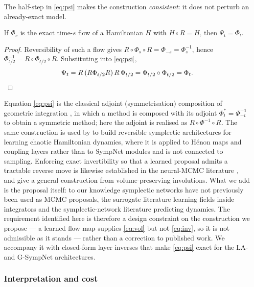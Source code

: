 The half-step in \eqref{eq:psi} makes the construction \emph{consistent}: it
does not perturb an already-exact model.

\begin{lemma}
\label{lem:consistency}
If $\Phi_s$ is the exact time-$s$ flow of a Hamiltonian $H$ with $H \circ R = H$,
then $\Psi_t = \Phi_t$.
\end{lemma}

\begin{proof}
Reversibility of such a flow gives $R \circ \Phi_s \circ R = \Phi_{-s} = \Phi_s^{-1}$,
hence $\Phi_{t/2}^{-1} = R \circ \Phi_{t/2} \circ R$. Substituting into
\eqref{eq:psi},
\begin{equation*}
    \Psi_t = R \,(R \Phi_{t/2} R)\, R\, \Phi_{t/2}
           = \Phi_{t/2} \circ \Phi_{t/2} = \Phi_t . \qedhere
\end{equation*}
\end{proof}

Equation \eqref{eq:psi} is the classical adjoint (symmetrisation) composition
of geometric integration \cite{HairerLubichWanner}, in which a method is
composed with its adjoint $\Phi^{*}_t = \Phi_{-t}^{-1}$ to obtain a symmetric
method; here the adjoint is realised as $R \circ \Phi^{-1} \circ R$. The same
construction is used by \cite{valperga2022reversible} to build reversible
symplectic architectures for learning chaotic Hamiltonian dynamics, where it is
applied to H\'enon maps and coupling layers rather than to SympNet modules and
is not connected to sampling. Enforcing exact invertibility so that a learned
proposal admits a tractable reverse move is likewise established in the
neural-MCMC literature \cite{song2017nice, levy2018generalizing}, and
\cite{spanbauer2020involutive} give a general construction from
volume-preserving involutions. What we add is the proposal itself: to our
knowledge symplectic networks have not previously been used as MCMC proposals,
the surrogate literature learning fields inside integrators and the
symplectic-network literature predicting dynamics. The requirement identified
here is therefore a design constraint on the construction we propose --- a
learned flow map supplies \eqref{eq:vol} but not \eqref{eq:inv}, so it is not
admissible as it stands --- rather than a correction to published work. We
accompany it with closed-form layer inverses that make \eqref{eq:psi} exact for
the LA- and G-SympNet architectures.

\subsubsection{Interpretation and cost}

